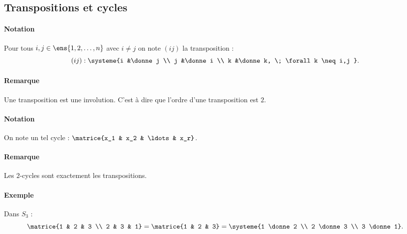 \subsection{Transpositions et cycles}
\paragraph{Notation}Pour tous $i,j \in \ens{1,2,\ldots,n}$ avec $i\neq j$ on note $(ij)$ la transposition : \[ (ij) : \systeme{i &\donne j \\ j &\donne i \\ k &\donne k, \; \forall k \neq i,j }. \]
\paragraph{Remarque}Une transposition est une involution. C'est à dire que l'ordre d'une transposition est $2$.

\paragraph{Notation}On  note un tel cycle : $\matrice{x_1 & x_2 & \ldots & x_r}$.
\paragraph{Remarque}Les $2$-cycles sont exactement les transpositions.
\paragraph{Exemple}Dans $S_3$ : \[ \matrice{1 & 2 & 3 \\ 2 & 3 & 1} = \matrice{1 & 2 & 3} = \systeme{1 \donne 2 \\ 2 \donne 3 \\ 3 \donne 1}.\]

